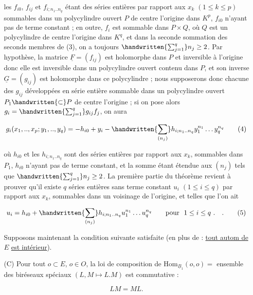 les $f_{i0}$, $f_{ij}$ et $f_{i;n_1..n_q}$ étant des séries entières par rapport aux $x_k$ $(1\leq k\leq p)$ sommables dans un polycylindre ouvert $P$ de centre l'origine dans $K^p$, $f_{i0}$ n'ayant pas de terme constant ; en outre, $f_i$ est sommable dans $P\times Q$, où $Q$ est un polycylindre de centre l'origine dans $K^q$, et dans la seconde sommation des seconds membres de (3), on a toujours $\handwritten{\sum_{j=1}^{q}}n_j\geq 2$. Par hypothèse, la matrice $\underline F=(f_{ij})$ est holomorphe dans $P$ et inversible à l'origine donc elle est inversible dans un polycylindre ouvert contenu dans $P$, et son inverse $\underline G=(g_{ij})$ est holomorphe dans ce polycylindre ; nous supposerons donc chacune des $g_{ij}$ développées en série entière sommable dans un polycylindre ouvert $P_1\handwritten{\subset} P$ de centre l'origine ; si on pose alors $g_i=\handwritten{\sum_{j=1}^{q}}g_{ij}f_j$, on aura

\[
g_i(x_1,..,x_p;y_1,..,y_q)=-h_{i0}+y_i-
\handwritten{\sum_{(n_j)}}h_{i;n_1..n_q}y_1^{n_1}\ldots y_q^{n_q}\tag*{(4)}
\]

où $h_{i0}$ et les $h_{i;n_1..n_q}$ sont des séries entières par rapport aux $x_k$, sommables dans $P_1$, $h_{i0}$ n'ayant pas de terme constant, et la somme étant étendue aux $(n_j)$ tels que $\handwritten{\sum_{j=1}^{q}} n_j\geq 2$. La première partie du théorème revient à prouver qu'il existe $q$ séries entières sans terme constant $u_i$ $(1\leq i\leq q)$ par rapport aux $x_k$, sommables dans un voisinage de l'origine, et telles que l'on ait

\[
u_i=h_{i0}+\handwritten{\sum_{(n_j)}}h_{i;n_1..n_q}u_1^{n_1}\ldots u_q^{n_q}
\qquad\text{pour }\ 1\leq i\leq q\ .\quad .\tag*{(5)}
\]

Supposons maintenant la condition suivante satisfaite (en plus de : \uline{tout autom de} $E$ \uline{est intérieur}).

(C) Pour tout $o\subset E$, $o\in O$, la loi de composition de $\mathrm{Hom}_{\underline B_1}(o,o)=$ ensemble des biréseaux spéciaux   $(L,M\longmapsto L.M)$ est commutative :

\[
LM=ML.
\]


